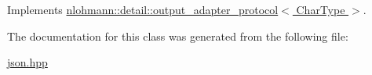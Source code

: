 Implements \hyperlink{structnlohmann_1_1detail_1_1output__adapter__protocol_a2f410a164e0eda17cf6561114b0eee4a}{nlohmann\+::detail\+::output\+\_\+adapter\+\_\+protocol$<$ Char\+Type $>$}.



The documentation for this class was generated from the following file\+:\begin{DoxyCompactItemize}
\item 
\hyperlink{json_8hpp}{json.\+hpp}\end{DoxyCompactItemize}
